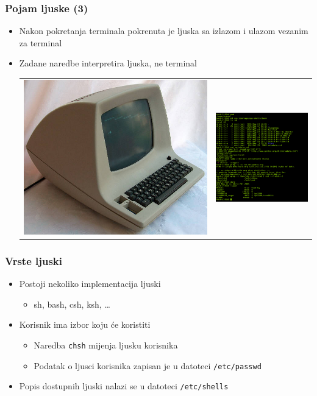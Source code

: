 \documentclass[table,usenames,dvipsnames]{beamer}
\newcommand{\shell}[1]{\texttt{#1}}
\begin{document}
\begin{frame}[t]
\frametitle{Pojam ljuske (3)}
\begin{itemize}
  \item Nakon pokretanja terminala pokrenuta je ljuska sa izlazom i ulazom 
        vezanim za terminal
  \item Zadane naredbe interpretira ljuska, ne terminal
  \begin{tabular}{c c}
    \includegraphics[width=0.45\linewidth]{terminal_old} &
    \includegraphics[width=0.45\linewidth,height=0.5\textheight]{terminal_new}
  \end{tabular}
\end{itemize}
\end{frame}

\begin{frame}[t]
\frametitle{Vrste ljuski}
\begin{itemize}
  \item Postoji nekoliko implementacija ljuski
  \begin{itemize}
    \item sh, bash, csh, ksh, \ldots
  \end{itemize}
  \item Korisnik ima izbor koju će koristiti
  \begin{itemize}
    \item Naredba \shell{chsh} mijenja ljusku korisnika
    \item Podatak o ljusci korisnika zapisan je u datoteci \shell{/etc/passwd} 
  \end{itemize}
  \item Popis dostupnih ljuski nalazi se u datoteci \shell{/etc/shells}
\end{itemize}
\end{frame}
\end{document}
